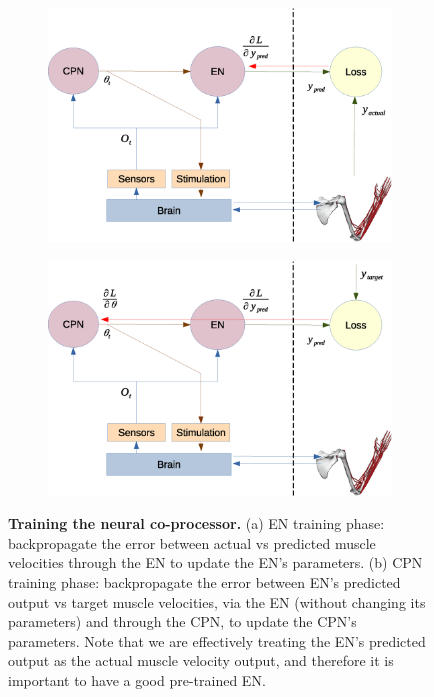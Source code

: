 \documentclass[12pt]{iopart}
\begin{document}
\begin{figure}
	\centering
	\begin{subfigure}[c]{0.48\textwidth}
		\centering
		\includegraphics[width=\textwidth]{backprop_en.eps}
		\caption{}
	\end{subfigure}
	\hfill
	\begin{subfigure}[c]{0.48\textwidth}
		\centering
		\includegraphics[width=\textwidth]{backprop_cpn.eps}
		\caption{}
	\end{subfigure}
	\hfill
\caption{\textbf{Training the neural co-processor.} (a) EN training phase: 
         backpropagate the error between actual vs predicted muscle velocities through the EN to update the EN's parameters.
         (b) CPN training phase: backpropagate the error between EN's predicted output vs target muscle velocities, via the
         EN (without changing its parameters) and through the CPN, to update the CPN's parameters. Note that we are effectively
         treating the EN's predicted output as the actual muscle velocity output, and therefore it is important to have a good
         pre-trained EN.}
\label{fig:training}
\end{figure}
\end{document}
